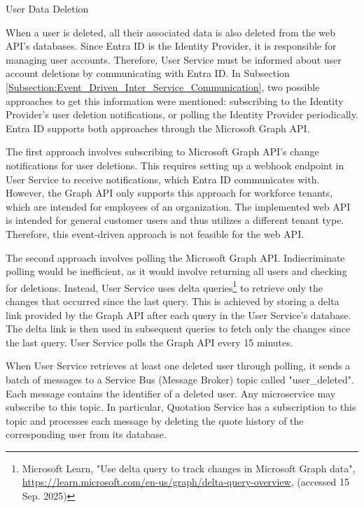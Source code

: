 \documentclass[12pt, reqno]{amsbook}
\makeatletter
\def\subsection{\@startsection{subsection}{2}%
      \z@{.5\linespacing\@plus.7\linespacing}{.25\linespacing}%
      {\normalfont\bfseries\flushleft}}
\theoremstyle{definition}
\theoremstyle{definition}
\numberwithin{section}{chapter}
\numberwithin{table}{chapter}
\numberwithin{figure}{chapter}
\makeatother
\begin{document}
\subsection{User Data Deletion}
\label{Subsection:User_Data_Deletion}

When a user is deleted, all their associated data is also deleted from the web \ac{API}'s databases. Since Entra ID is the Identity Provider, it is responsible for managing user accounts. Therefore, User Service must be informed about user account deletions by communicating with Entra ID. In Subsection \ref{Subsection:Event_Driven_Inter_Service_Communication}, two possible approaches to get this information were mentioned: subscribing to the Identity Provider's user deletion notifications, or polling the Identity Provider periodically. Entra ID supports both approaches through the Microsoft Graph \ac{API}.

The first approach involves subscribing to Microsoft Graph \ac{API}'s change notifications for user deletions. This requires setting up a webhook endpoint in User Service to receive notifications, which Entra ID communicates with. However, the Graph \ac{API} only supports this approach for workforce tenants, which are intended for employees of an organization. The implemented web \ac{API} is intended for general customer users and thus utilizes a different tenant type. Therefore, this event-driven approach is not feasible for the web \ac{API}.

The second approach involves polling the Microsoft Graph \ac{API}. Indiscriminate polling would be inefficient, as it would involve returning all users and checking for deletions. Instead, User Service uses delta queries\footnote{Microsoft Learn, "Use delta query to track changes in Microsoft Graph data", \url{https://learn.microsoft.com/en-us/graph/delta-query-overview}, (accessed 15 Sep. 2025)} to retrieve only the changes that occurred since the last query. This is achieved by storing a delta link provided by the Graph \ac{API} after each query in the User Service's database. The delta link is then used in subsequent queries to fetch only the changes since the last query. User Service polls the Graph \ac{API} every 15 minutes.

When User Service retrieves at least one deleted user through polling, it sends a batch of messages to a Service Bus (Message Broker) topic called "user\_deleted". Each message contains the identifier of a deleted user. Any microservice may subscribe to this topic. In particular, Quotation Service has a subscription to this topic and processes each message by deleting the quote history of the corresponding user from its database.
\end{document}
